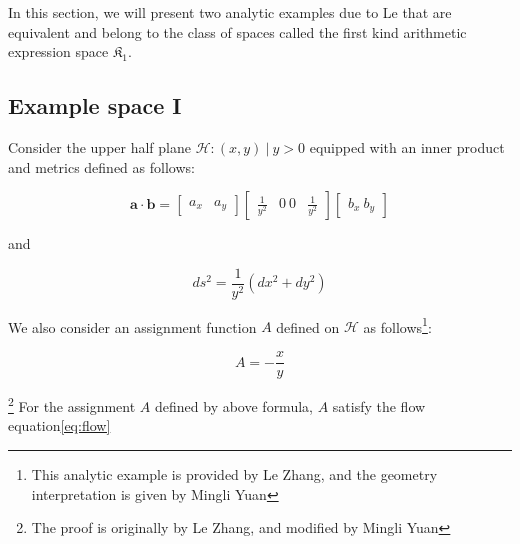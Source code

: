 
In this section, we will present two analytic examples due to Le that are equivalent and belong to the class of spaces
called the first kind arithmetic expression space $\mathfrak{K}_1$.

\subsection{Example space I}\label{subsec:exmp1}

Consider the upper half plane ${\mathcal{H}: (x, y) \ | \ y > 0}$ equipped with an inner product and metrics defined as follows:

$$
\mathbf{a} \cdot \mathbf{b} = \begin{bmatrix} a_x & a_y \end{bmatrix} \begin{bmatrix} \frac{1}{y^2} & 0 \ 0 & \frac{1}{y^2} \end{bmatrix} \begin{bmatrix} b_x \ b_y \end{bmatrix}
$$

and

$$
ds^2 = \frac{1}{y^2} (dx^2 + dy^2)
$$

We also consider an assignment function $A$ defined on $\mathcal{H}$ as follows\footnote{This analytic example is provided by Le Zhang, and the geometry interpretation is given by Mingli Yuan}:

\begin{equation}
A = - \frac{x}{y}
\end{equation}

\begin{theorem}\footnote{The proof is originally by Le Zhang, and modified by Mingli Yuan}
For the assignment $A$ defined by above formula, $A$ satisfy the flow equation\eqref{eq:flow}
\end{theorem}

